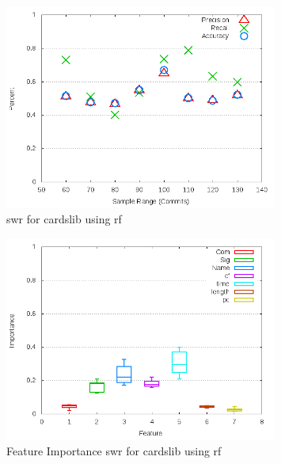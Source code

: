 \begin{figure}[!t]
\centering
\includegraphics[width=0.8\textwidth]{images/rf/test_1/cardslib_sample_range.png}
\caption{\gls{swr} for cardslib using \gls{rf}}
\label{fig:test_1_cardslib_rf}
\end{figure}

\begin{figure}[!t]
\centering
\includegraphics[width=0.8\textwidth]{images/rf/test_1/cardslib_importance.png}
\caption{Feature Importance \gls{swr} for cardslib using \gls{rf}}
\label{fig:test_1_cardslib_rf_importance}
\end{figure}


